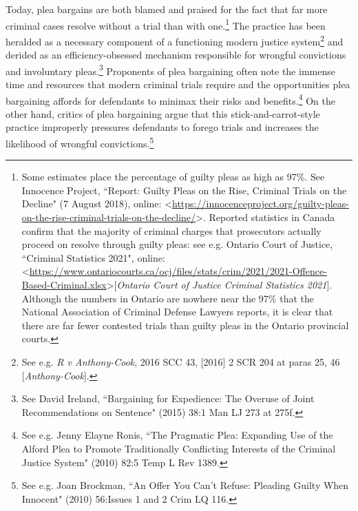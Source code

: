 Today, plea bargains are both blamed and praised for the fact that far more criminal cases resolve without a trial than with one.\footnote{Some estimates place the percentage of guilty pleas as high as 97\%. See Innocence Project, ``Report: Guilty Pleas on the Rise, Criminal Trials on the Decline" (7 August 2018), online: \textless \url{https://innocenceproject.org/guilty-pleas-on-the-rise-criminal-trials-on-the-decline/}\textgreater. Reported statistics in Canada confirm that the majority of criminal charges that prosecutors actually proceed on resolve through guilty pleas: see e.g. Ontario Court of Justice, ``Criminal Statistics 2021", online: \textless \url{https://www.ontariocourts.ca/ocj/files/stats/crim/2021/2021-Offence-Based-Criminal.xlsx}\textgreater \hspace{1mm}[\textit{Ontario Court of Justice Criminal Statistics 2021}]. Although the numbers in Ontario are nowhere near the 97\% that the National Association of Criminal Defense Lawyers reports, it is clear that there are far fewer contested trials than guilty pleas in the Ontario provincial courts.} The practice has been heralded as a necessary component of a functioning modern justice system\footnote{See e.g. \textit{R v Anthony-Cook}, 2016 SCC 43, [2016] 2 SCR 204 at paras 25, 46 [\textit{Anthony-Cook}].} and derided as an efficiency-obsessed mechanism responsible for wrongful convictions and involuntary pleas.\footnote{See David Ireland, ``Bargaining for Expedience: The Overuse of Joint Recommendations on Sentence" (2015) 38:1 Man LJ 273 at 275f.} Proponents of plea bargaining often note the immense time and resources that modern criminal trials require and the opportunities plea bargaining affords for defendants to minimax their risks and benefits.\footnote{See e.g. Jenny Elayne Ronis, ``The Pragmatic Plea: Expanding Use of the Alford Plea to Promote Traditionally Conflicting Interests of the Criminal Justice System" (2010) 82:5 Temp L Rev 1389.} On the other hand, critics of plea bargaining argue that this stick-and-carrot-style practice improperly pressures defendants to forego trials and increases the likelihood of wrongful convictions.\footnote{See e.g. Joan Brockman, ``An Offer You Can't Refuse: Pleading Guilty When Innocent" (2010) 56:Issues 1 and 2 Crim LQ 116.}

